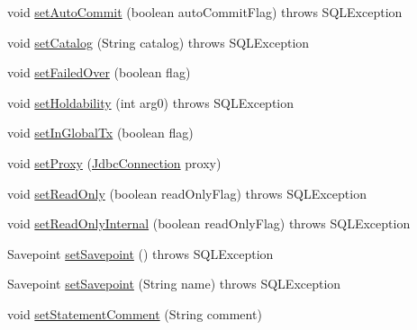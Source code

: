 \begin{DoxyCompactItemize}
\item 
void \mbox{\hyperlink{classcom_1_1mysql_1_1cj_1_1jdbc_1_1ha_1_1_multi_host_my_s_q_l_connection_a0bae3a8893472a934d5f0a8247083f79}{set\+Auto\+Commit}} (boolean auto\+Commit\+Flag)  throws S\+Q\+L\+Exception 
\item 
void \mbox{\hyperlink{classcom_1_1mysql_1_1cj_1_1jdbc_1_1ha_1_1_multi_host_my_s_q_l_connection_ac5b5de38f432b66b204ab94f3bcabb3a}{set\+Catalog}} (String catalog)  throws S\+Q\+L\+Exception 
\item 
void \mbox{\hyperlink{classcom_1_1mysql_1_1cj_1_1jdbc_1_1ha_1_1_multi_host_my_s_q_l_connection_aa86a711c0807cc5b31b9e3600477184b}{set\+Failed\+Over}} (boolean flag)
\item 
void \mbox{\hyperlink{classcom_1_1mysql_1_1cj_1_1jdbc_1_1ha_1_1_multi_host_my_s_q_l_connection_ad435a72c578f5dc749fc299c2e3677f0}{set\+Holdability}} (int arg0)  throws S\+Q\+L\+Exception 
\item 
void \mbox{\hyperlink{classcom_1_1mysql_1_1cj_1_1jdbc_1_1ha_1_1_multi_host_my_s_q_l_connection_a317920d3dc1f80c789676ad3391135bc}{set\+In\+Global\+Tx}} (boolean flag)
\item 
void \mbox{\hyperlink{classcom_1_1mysql_1_1cj_1_1jdbc_1_1ha_1_1_multi_host_my_s_q_l_connection_a623bbf5d735cd8f161ad529702e30895}{set\+Proxy}} (\mbox{\hyperlink{interfacecom_1_1mysql_1_1cj_1_1jdbc_1_1_jdbc_connection}{Jdbc\+Connection}} proxy)
\item 
void \mbox{\hyperlink{classcom_1_1mysql_1_1cj_1_1jdbc_1_1ha_1_1_multi_host_my_s_q_l_connection_a6b44291fee3ab9231f0b69193d052125}{set\+Read\+Only}} (boolean read\+Only\+Flag)  throws S\+Q\+L\+Exception 
\item 
void \mbox{\hyperlink{classcom_1_1mysql_1_1cj_1_1jdbc_1_1ha_1_1_multi_host_my_s_q_l_connection_a7fb4a2245de12b8d29adf4e213d99ed5}{set\+Read\+Only\+Internal}} (boolean read\+Only\+Flag)  throws S\+Q\+L\+Exception 
\item 
Savepoint \mbox{\hyperlink{classcom_1_1mysql_1_1cj_1_1jdbc_1_1ha_1_1_multi_host_my_s_q_l_connection_a935d7c4ab643db931af943be82c2a5f9}{set\+Savepoint}} ()  throws S\+Q\+L\+Exception 
\item 
Savepoint \mbox{\hyperlink{classcom_1_1mysql_1_1cj_1_1jdbc_1_1ha_1_1_multi_host_my_s_q_l_connection_ac2ba286456f46addcd0d6d77dbba3b87}{set\+Savepoint}} (String name)  throws S\+Q\+L\+Exception 
\item 
void \mbox{\hyperlink{classcom_1_1mysql_1_1cj_1_1jdbc_1_1ha_1_1_multi_host_my_s_q_l_connection_a4e028eb0c700613a20c0a2b7f8a21170}{set\+Statement\+Comment}} (String comment)

\end{DoxyCompactItemize}
